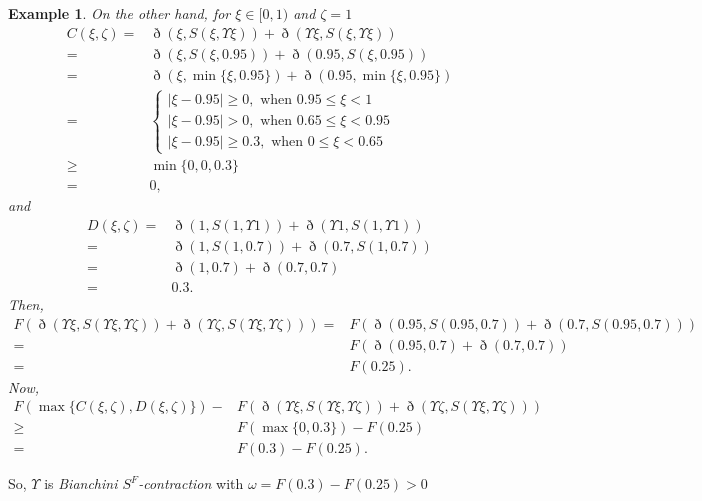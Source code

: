 \documentclass[pdflatex,sn-mathphys-num]{sn-jnl}%
\theoremstyle{thmstyleone}%
\theoremstyle{thmstyletwo}%
\newtheorem{example}{Example}%
\theoremstyle{thmstylethree}%
\begin{document}
\begin{example}
On the other hand, for $\xi \in [0,1)$ and $\zeta =1$
\begin{align*}
    C(\xi ,\zeta)=&\eth(\xi,S(\xi,\Upsilon \xi ))+\eth(\Upsilon \xi,S(\xi,\Upsilon \xi ))\\
    =&\eth(\xi,S(\xi,0.95))+\eth(0.95,S(\xi,0.95))\\
    =&\eth(\xi,\min\{\xi ,0.95\})+\eth(0.95,\min\{\xi ,0.95\})\\
    =& \begin{cases}
       |\xi -0.95|\ge 0, \text{ when } 0.95\le \xi< 1\\
       |\xi -0.95|> 0, \text{ when } 0.65\le \xi < 0.95\\
        |\xi -0.95|\ge 0.3, \text{ when } 0\le \xi < 0.65
    \end{cases}\\
\ge& \min\{0,0,0.3\}\\
=& 0,
\end{align*}
and
\begin{align*}
    D(\xi ,\zeta)=&\eth(1,S(1,\Upsilon  1))+\eth(\Upsilon 1,S(1,\Upsilon  1))\\
    =&\eth(1,S(1,0.7))+\eth(0.7,S(1,0.7))\\
    =&\eth(1,0.7)+\eth(0.7,0.7)\\
    =&0.3.
\end{align*}
Then,
\begin{align*}
F\left(\eth(\Upsilon \xi,S(\Upsilon \xi,\Upsilon \zeta))+\eth(\Upsilon \zeta,S(\Upsilon \xi,\Upsilon \zeta))\right)=&F\left(\eth(0.95,S(0.95,0.7))+\eth(0.7,S(0.95,0.7))\right)\\
=&F\left(\eth(0.95,0.7)+\eth(0.7,0.7)\right)\\
=&F(0.25).
\end{align*}
Now, 
 \begin{align*}
   F\left(\max\{C(\xi ,\zeta),D(\xi ,\zeta)\}\right)- &F\left(\eth(\Upsilon \xi,S(\Upsilon \xi,\Upsilon \zeta))+\eth(\Upsilon \zeta,S(\Upsilon \xi,\Upsilon \zeta))\right)\\
   \ge& F\left(\max\{0,0.3\}\right)-F\left(0.25\right)\\
   =& F(0.3)-F(0.25).
 \end{align*}
\end{example}
 So, $\Upsilon $ is \textit{Bianchini $S^F$-contraction} with $\omega  =F(0.3)-F(0.25)>0$
\end{document}
